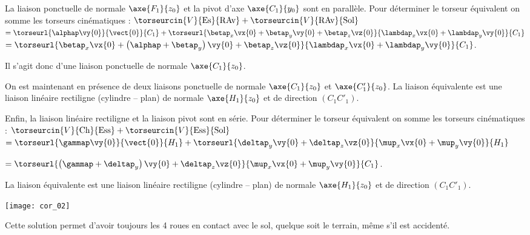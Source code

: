 \ifprof
\begin{corrige}
La liaison ponctuelle de normale $\axe{F_1}{z_0}$ et la pivot d'axe $\axe{C_1}{y_0}$ sont en parallèle. Pour déterminer le torseur équivalent on somme les torseurs cinématiques :
$\torseurcin{V}{\text{Es}}{\text{RAv}} + \torseurcin{V}{\text{RAv}}{\text{Sol}}$
$=\torseurl{\alphap \vy{0}}{\vect{0}}{C_1}+\torseurl{\betap_x \vx{0}+\betap_y \vy{0}+\betap_z \vz{0}}{\lambdap_x\vx{0}+\lambdap_y\vy{0}}{C_1}$
$=
\torseurl{\betap_x \vx{0}+\left(\alphap + \betap_y \right)\vy{0}+\betap_z \vz{0}}{\lambdap_x\vx{0}+\lambdap_y\vy{0}}{C_1}$.

Il s'agit donc d'une liaison ponctuelle de normale $\axe{C_1}{z_0}$.

\vspace{.4cm}

On est maintenant en présence de deux liaisons ponctuelle de normale $\axe{C_1}{z_0}$ et $\axe{C'_1}{z_0}$. La liaison équivalente est une liaison linéaire rectiligne (cylindre -- plan) de normale 
$\axe{H_1}{z_0}$ et de direction $(C_1C'_1)$.

\vspace{.4cm}

Enfin, la liaison linéaire rectiligne et la liaison pivot sont en série. Pour déterminer le torseur équivalent on somme les torseurs cinématiques :
$\torseurcin{V}{\text{Ch}}{\text{Ess}} + \torseurcin{V}{\text{Ess}}{\text{Sol}}$
$=\torseurl{\gammap \vy{0}}{\vect{0}}{H_1}+\torseurl{\deltap_y \vy{0}+\deltap_z \vz{0}}{\mup_x\vx{0}+\mup_y\vy{0}}{H_1}$

$=\torseurl{\left(\gammap +\deltap_y \right)\vy{0}+\deltap_z \vz{0}}{\mup_x\vx{0}+\mup_y\vy{0}}{C_1}$.

La liaison équivalente est une liaison linéaire rectiligne (cylindre -- plan) de normale 
$\axe{H_1}{z_0}$ et de direction $(C_1C'_1)$.

\begin{center}
\texttt{[image: cor\_02]}
\end{center}

\end{corrige}
\else\fi

\ifprof
\begin{corrige}
Cette solution permet d'avoir toujours les 4 roues en contact avec le sol, quelque soit le terrain, même s'il est accidenté. 
\end{corrige}
\else\fi

